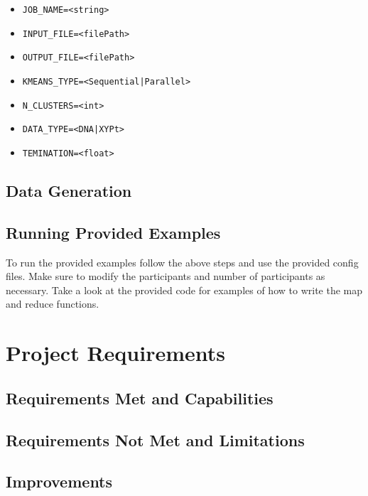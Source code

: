 \documentclass[12pt]{article}
\newcommand{\ttt}{\texttt}
\begin{document}
\begin{itemize}
\item
\ttt{JOB\_NAME=<string>}

\item
\ttt{INPUT\_FILE=<filePath>}

\item
\ttt{OUTPUT\_FILE=<filePath>}

\item
\ttt{KMEANS\_TYPE=<Sequential|Parallel>}

\item
\ttt{N\_CLUSTERS=<int>}

\item
\ttt{DATA\_TYPE=<DNA|XYPt>}

\item
\ttt{TEMINATION=<float>}

\end{itemize}

\subsection{Data Generation}

\subsection{Running Provided Examples}

To run the provided examples follow the above steps and use the provided config files. Make sure to modify the participants and number of participants as necessary. Take a look at the provided code for examples of how to write the map and reduce functions.

\section{Project Requirements}

\subsection{Requirements Met and Capabilities}

\subsection{Requirements Not Met and Limitations}

\subsection{Improvements}
\end{document}
